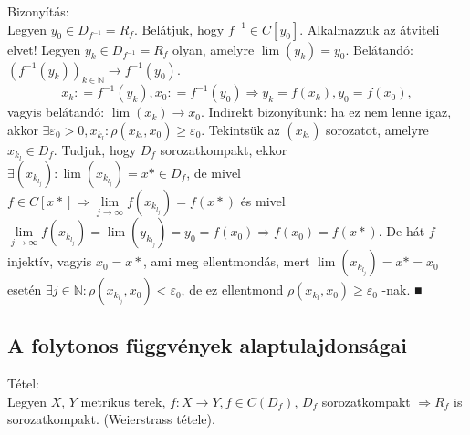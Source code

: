 \documentclass[12pt,a4paper]{scrartcl}
\newenvironment{tetel}{}{}
\newenvironment{bizonyitas}{}{}
\begin{document}
\begin{bizonyitas}

Bizonyítás:\\
Legyen \(y_{0} \in D_{f^{- 1}} = R_{f}\). Belátjuk, hogy
\(f^{- 1} \in C\left\lbrack y_{0} \right\rbrack\). Alkalmazzuk az
átviteli elvet! Legyen \(y_{k} \in D_{f^{- 1}} = R_{f}\) olyan, amelyre
\(\lim\left( y_{k} \right) = y_{0}\). Belátandó:
\(\left. \left( {f^{- 1}\left( y_{k} \right)} \right)_{k \in {\mathbb{N}}}\rightarrow f^{- 1}\left( y_{0} \right) \right.\).
\[\left. x_{k}: = f^{- 1}\left( y_{k} \right),x_{0}: = f^{- 1}\left( y_{0} \right)\Rightarrow y_{k} = f\left( x_{k} \right),y_{0} = f{\left( x_{0} \right),} \right.\]
vagyis belátandó:
\(\left. \lim\left( x_{k} \right)\rightarrow x_{0} \right.\). Indirekt
bizonyítunk: ha ez nem lenne igaz, akkor
\(\exists\varepsilon_{0} > 0,x_{k_{l}}:\rho\left( {x_{k_{l}},x_{0}} \right) \geq \varepsilon_{0}\).
Tekintsük az \(\left( x_{k_{l}} \right)\) sorozatot, amelyre
\(x_{k_{l}} \in D_{f}\). Tudjuk, hogy \(D_{f}\) sorozatkompakt, ekkor
\(\exists\left( x_{k_{l_{j}}} \right):\lim\left( x_{k_{l_{j}}} \right) = x* \in D_{f}\),
de mivel
\(\left. f \in C\left\lbrack {x*} \right\rbrack\Rightarrow\underset{j\rightarrow\infty}{\lim}f\left( x_{k_{l_{j}}} \right) = f\left( {x*} \right) \right.\)
és mivel
\(\left. \underset{j\rightarrow\infty}{\lim}f\left( x_{k_{l_{j}}} \right) = \lim\left( y_{k_{l_{j}}} \right) = y_{0} = f\left( x_{0} \right)\Rightarrow f\left( x_{0} \right) = f\left( {x*} \right) \right.\).
De hát \(f\) injektív, vagyis \(x_{0} = x*\), ami meg ellentmondás, mert
\(\lim\left( x_{k_{l_{j}}} \right) = x* = x_{0}\) esetén
\(\exists j \in {\mathbb{N}}:\rho\left( {x_{k_{l_{j}}},x_{0}} \right) < \varepsilon_{0}\),
de ez ellentmond
\(\rho\left( {x_{k_{l}},x_{0}} \right) \geq \varepsilon_{0}\) -nak. ■

\end{bizonyitas}

\hypertarget{a-folytonos-fuggvenyek-alaptulajdonsagai}{%
\subsection{A folytonos függvények
alaptulajdonságai}\label{a-folytonos-fuggvenyek-alaptulajdonsagai}}

\begin{tetel}

Tétel:\\
Legyen \(X\), \(Y\) metrikus terek,
\(\left. f:X\rightarrow Y,f \in C\left( D_{f} \right) \right.\),
\(D_{f}\) sorozatkompakt \(\left. \Rightarrow R_{f} \right.\) is
sorozatkompakt. (Weierstrass tétele).

\end{tetel}
\end{document}
